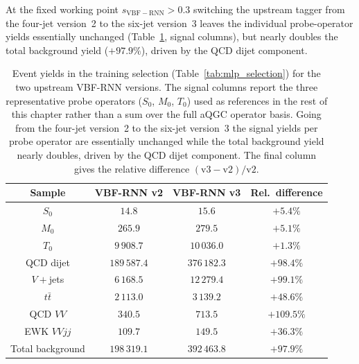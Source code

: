 At the fixed working point $s_{\mathrm{VBF-RNN}}>0.3$ switching the upstream tagger from the four-jet version~2 to the six-jet version~3 leaves the individual probe-operator yields essentially unchanged (Table~\ref{tab:mlp_yields}, signal columns), but nearly doubles the total background yield ($+97.9\%$), driven by the QCD dijet component.

\begin{table}[htbp]
  \centering
  \caption{Event yields in the training selection (Table~\ref{tab:mlp_selection}) for the two upstream VBF-RNN versions. The signal columns report the three representative probe operators ($S_0$, $M_0$, $T_0$) used as references in the rest of this chapter rather than a sum over the full aQGC operator basis. Going from the four-jet version~2 to the six-jet version~3 the signal yields per probe operator are essentially unchanged while the total background yield nearly doubles, driven by the QCD dijet component. The final column gives the relative difference $(\mathrm{v3}-\mathrm{v2})/\mathrm{v2}$.}
  \label{tab:mlp_yields}
  \begin{tabular}{|c|c|c|c|}
    \hline
    \textbf{Sample} & \textbf{VBF-RNN v2} & \textbf{VBF-RNN v3} & \textbf{Rel.\ difference} \\
    \hline
    $S_0$ & $14.8$    & $15.6$ & $+5.4\%$ \\
    $M_0$ & $265.9$   & $279.5$ & $+5.1\%$ \\
    $T_0$ & $9\,908.7$ & $10\,036.0$ & $+1.3\%$ \\
    \hline
    QCD dijet         & $189\,587.4$ & $376\,182.3$ & $+98.4\%$ \\
    $V+$jets          & $6\,168.5$   & $12\,279.4$ & $+99.1\%$ \\
    $t\bar{t}$        & $2\,113.0$   & $3\,139.2$ & $+48.6\%$ \\
    QCD $VV$          & $340.5$      & $713.5$ & $+109.5\%$ \\
    EWK $VVjj$        & $109.7$      & $149.5$ & $+36.3\%$ \\
    \hline
    Total background  & $198\,319.1$ & $392\,463.8$ & $+97.9\%$ \\
    \hline
  \end{tabular}
\end{table}

